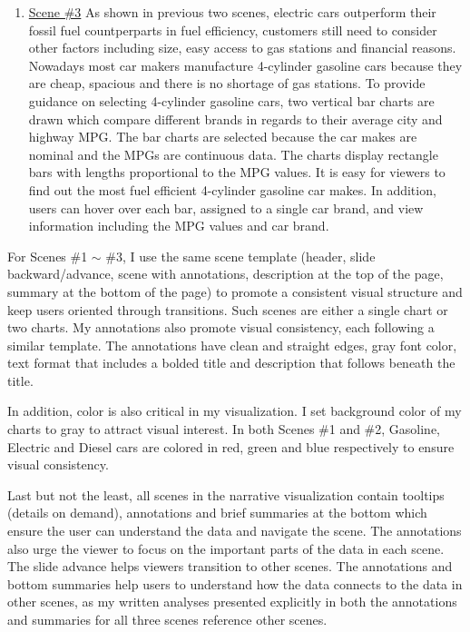 \documentclass[11pt]{article}
\begin{document}
\begin{enumerate}
	\item \underline{Scene \#3}
	As shown in previous two scenes, electric cars outperform their fossil fuel countperparts in fuel efficiency,  customers still need to consider other factors including size, easy access to gas stations and financial reasons. Nowadays most car makers manufacture 4-cylinder gasoline cars because they are cheap, spacious and there is no shortage of gas stations. To provide guidance on selecting 4-cylinder gasoline cars, two vertical bar charts are drawn which compare different brands in regards to their average city and highway MPG. The bar charts are selected because the car makes are nominal and the MPGs are continuous data. The charts display rectangle bars with lengths proportional to the MPG values. It is easy for viewers to find out the most fuel efficient 4-cylinder gasoline car makes.  In addition, users can hover over each bar, assigned to a single car brand, and view information including the MPG values and car brand.
\end{enumerate}

For Scenes \#1 $\sim$ \#3,  I use the same scene template (header, slide backward/advance, scene with annotations, description at the top of the page, summary at the bottom of the page) to promote a consistent visual structure and keep users oriented through transitions. Such scenes are either a single chart or two charts. My annotations also promote visual consistency, each following a similar template. The annotations have clean and straight edges, gray font color, text format that includes a bolded title and description that follows beneath the title.

In addition, color is also critical in my visualization. I set background color of my charts to gray to attract visual interest. In both Scenes \#1 and \#2, Gasoline, Electric and Diesel cars are colored in red, green and blue respectively to ensure visual consistency.

Last but not the least, all scenes in the narrative visualization contain tooltips (details on demand), annotations and brief summaries at the bottom which ensure the user can understand the data and navigate the scene. The annotations also urge the viewer to focus on the important parts of the data in each scene. The slide advance helps viewers transition to other scenes. The annotations and bottom summaries help users to understand how the data connects to the data in other scenes, as my written analyses presented explicitly in both the annotations and summaries for all three scenes reference other scenes.
\end{document}
